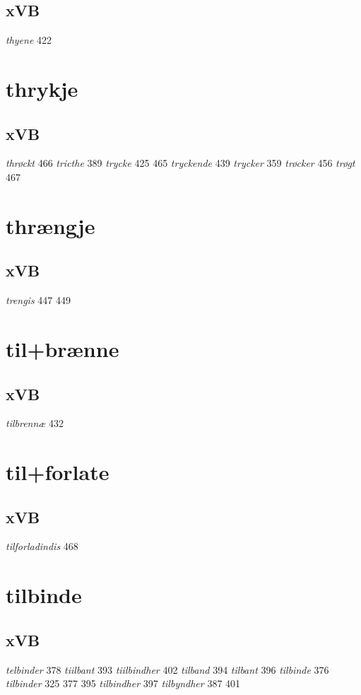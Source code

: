 \documentclass[a4paper,twocolumn]{article}
\begin{document}
\subsection{xVB}
\label{sec:orgdcce72e}
\emph{thyene} 422 
\section{thrykje}
\label{sec:orgb24d8b4}
\subsection{xVB}
\label{sec:org2f0526c}
\emph{thrøckt} 466 \emph{tricthe} 389 \emph{trycke} 425 465 \emph{tryckende} 439 \emph{trycker} 359 \emph{trøcker} 456 \emph{trøgt} 467 
\section{thrængje}
\label{sec:org90a78ca}
\subsection{xVB}
\label{sec:orgc29e1a0}
\emph{trengis} 447 449 
\section{til+brænne}
\label{sec:org408052c}
\subsection{xVB}
\label{sec:orgbf32def}
\emph{tilbrennæ} 432 
\section{til+forlate}
\label{sec:org310e01f}
\subsection{xVB}
\label{sec:org33fdf04}
\emph{tilforladindis} 468 
\section{tilbinde}
\label{sec:org87345e2}
\subsection{xVB}
\label{sec:orgc74ce3f}
\emph{telbinder} 378 \emph{tiilbant} 393 \emph{tiilbindher} 402 \emph{tilband} 394 \emph{tilbant} 396 \emph{tilbinde} 376 \emph{tilbinder} 325 377 395 \emph{tilbindher} 397 \emph{tilbyndher} 387 401 
\end{document}
